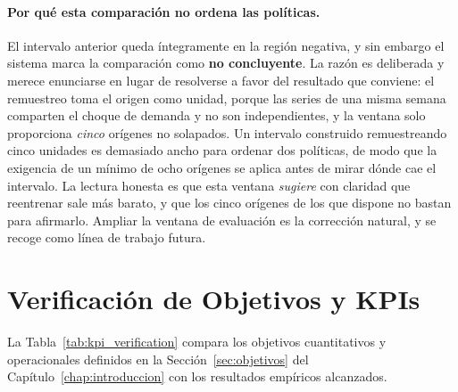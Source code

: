 \paragraph{Por qué esta comparación no ordena las políticas.} El intervalo anterior queda íntegramente en la región negativa, y sin embargo el sistema marca la comparación como \textbf{no concluyente}. La razón es deliberada y merece enunciarse en lugar de resolverse a favor del resultado que conviene: el remuestreo toma el origen como unidad, porque las series de una misma semana comparten el choque de demanda y no son independientes, y la ventana solo proporciona \emph{cinco} orígenes no solapados. Un intervalo construido remuestreando cinco unidades es demasiado ancho para ordenar dos políticas, de modo que la exigencia de un mínimo de ocho orígenes se aplica antes de mirar dónde cae el intervalo. La lectura honesta es que esta ventana \emph{sugiere} con claridad que reentrenar sale más barato, y que los cinco orígenes de los que dispone no bastan para afirmarlo. Ampliar la ventana de evaluación es la corrección natural, y se recoge como línea de trabajo futura.

\clearpage
\section{Verificación de Objetivos y KPIs}
\label{sec:resultados_kpis}

La Tabla~\ref{tab:kpi_verification} compara los objetivos cuantitativos y operacionales definidos en la Sección~\ref{sec:objetivos} del Capítulo~\ref{chap:introduccion} con los resultados empíricos alcanzados.

